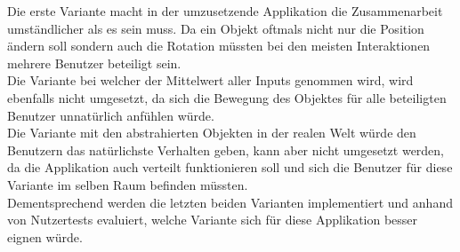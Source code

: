 \bigskip
Die erste Variante macht in der umzusetzende Applikation die Zusammenarbeit umständlicher als es sein muss. Da ein Objekt oftmals nicht nur die Position ändern soll sondern auch die Rotation müssten bei den meisten Interaktionen mehrere Benutzer beteiligt sein. \\
Die Variante bei welcher der Mittelwert aller Inputs genommen wird, wird ebenfalls nicht umgesetzt, da sich die Bewegung des Objektes für alle beteiligten Benutzer unnatürlich anfühlen würde. \\
Die Variante mit den abstrahierten Objekten in der realen Welt würde den Benutzern das natürlichste Verhalten geben, kann aber nicht umgesetzt werden, da die Applikation auch verteilt funktionieren soll und sich die Benutzer für diese Variante im selben Raum befinden müssten. \\
Dementsprechend werden die letzten beiden Varianten implementiert und anhand von Nutzertests evaluiert, welche Variante sich für diese Applikation besser eignen würde.